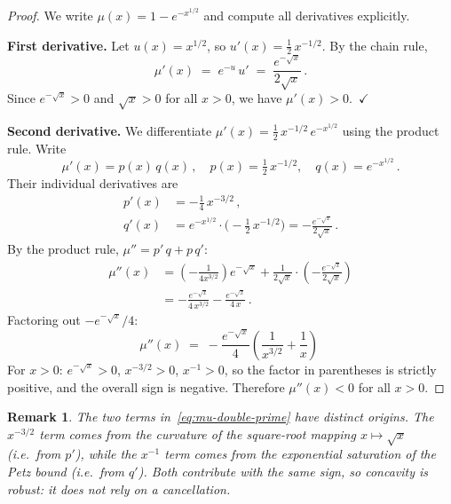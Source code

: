 \documentclass[prd,twocolumn,superscriptaddress,longbibliography,floatfix]{revtex4-2}
\newtheorem*{remark}{Remark}
\begin{document}
\begin{proof}
We write $\mu(x) = 1 - e^{-x^{1/2}}$ and compute all derivatives
explicitly.

\textbf{First derivative.}
Let $u(x) = x^{1/2}$, so $u'(x) = \tfrac{1}{2}\,x^{-1/2}$.
By the chain rule,
\begin{equation}
  \mu'(x) \;=\; e^{-u}\,u'
  \;=\; \frac{e^{-\sqrt{x}}}{2\sqrt{x}}\,.
  \label{eq:mu-prime}
\end{equation}
Since $e^{-\sqrt{x}} > 0$ and $\sqrt{x} > 0$ for all $x > 0$,
we have $\mu'(x) > 0$.~$\checkmark$

\textbf{Second derivative.}
We differentiate $\mu'(x) = \tfrac{1}{2}\,x^{-1/2}\,e^{-x^{1/2}}$
using the product rule.  Write
\begin{equation}
  \mu'(x) = p(x)\,q(x)\,,\quad
  p(x) = \tfrac{1}{2}\,x^{-1/2},\quad
  q(x) = e^{-x^{1/2}}\,.
\end{equation}
Their individual derivatives are
\begin{align}
  p'(x) &= -\frac{1}{4}\,x^{-3/2}\,,
  \label{eq:p-prime}\\[4pt]
  q'(x) &= e^{-x^{1/2}} \cdot \bigl(-\tfrac{1}{2}\,x^{-1/2}\bigr)
         = -\frac{e^{-\sqrt{x}}}{2\sqrt{x}}\,.
  \label{eq:q-prime}
\end{align}
By the product rule, $\mu'' = p'\,q + p\,q'$:
\begin{align}
  \mu''(x) &= \left(-\frac{1}{4x^{3/2}}\right) e^{-\sqrt{x}}
    + \frac{1}{2\sqrt{x}} \cdot
      \left(-\frac{e^{-\sqrt{x}}}{2\sqrt{x}}\right)
    \nonumber\\[4pt]
  &= -\frac{e^{-\sqrt{x}}}{4\,x^{3/2}}
     -\frac{e^{-\sqrt{x}}}{4\,x}\,.
  \label{eq:mu-double-prime-expand}
\end{align}
Factoring out $-e^{-\sqrt{x}}/4$:
\begin{equation}
  \boxed{\;\mu''(x) \;=\;
    -\frac{e^{-\sqrt{x}}}{4}
    \left(\frac{1}{x^{3/2}} + \frac{1}{x}\right)\;\;}
  \label{eq:mu-double-prime}
\end{equation}
For $x > 0$: $e^{-\sqrt{x}} > 0$, $x^{-3/2} > 0$, $x^{-1} > 0$,
so the factor in parentheses is strictly positive, and the overall
sign is negative.  Therefore $\mu''(x) < 0$ for all $x > 0$.
\end{proof}

\begin{remark}
The two terms in~\eqref{eq:mu-double-prime} have distinct origins.
The $x^{-3/2}$ term comes from the curvature of the square-root
mapping $x \mapsto \sqrt{x}$ (i.e.\ from $p'$), while the $x^{-1}$
term comes from the exponential saturation of the Petz bound (i.e.\
from $q'$).
Both contribute with the same sign, so concavity is \emph{robust}:
it does not rely on a cancellation.
\end{remark}
\end{document}
